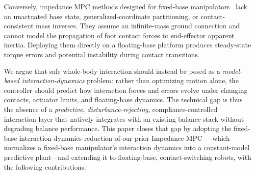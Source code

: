 Conversely, impedance MPC methods designed for fixed-base
manipulators~\cite{cao2026impedance,cao2023passive,haninger2022model,roveda2020model}
lack an unactuated base state, generalized-coordinate partitioning, or
contact-consistent mass inverses.
They assume an infinite-mass ground connection and cannot model the
propagation of foot contact forces to end-effector apparent inertia.
Deploying them directly on a floating-base platform produces steady-state
torque errors and potential instability during contact transitions.

We argue that safe whole-body interaction should instead be posed as a
\emph{model-based interaction-dynamics} problem: rather than optimizing
motion alone, the controller should predict how interaction forces and errors
evolve under changing contacts, actuator limits, and floating-base dynamics.
The technical gap is thus the absence of a \emph{predictive},
\emph{disturbance-rejecting}, compliance-controlled interaction layer that
natively integrates with an existing balance stack without degrading balance
performance. This paper closes that gap by adopting the fixed-base
interaction-dynamics reduction of our prior Impedance
MPC~\cite{cao2026impedance}---which normalizes a fixed-base manipulator's
interaction dynamics into a constant-model predictive plant---and extending
it to floating-base, contact-switching robots, with the following
contributions:


